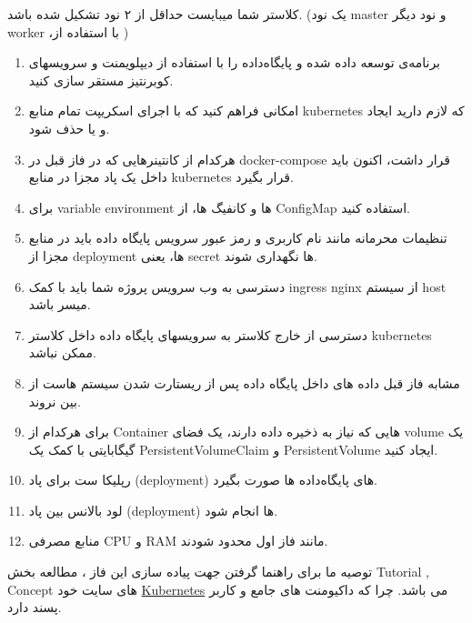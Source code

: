 {کلاستر شما میبایست حداقل از ۲ نود تشکیل شده باشد. (یک نود master و نود دیگر worker ،با استفاده از )
\begin{enumerate}
\item برنامه‌ی توسعه داده شده و پایگاه‌داده را با استفاده از دیپلویمنت و سرویسهای کوبرنتیز مستقر سازی کنید.

\item امکانی فراهم کنید که با اجرای اسکریپت تمام منابع kubernetes که لازم دارید ایجاد و یا حذف شود.

\item هرکدام از کانتینرهایی که در فاز قبل در docker-compose قرار داشت، اکنون باید داخل یک پاد مجزا در منابع kubernetes قرار بگیرد.

\item برای variable environment ها و کانفیگ ها، از ConfigMap استفاده کنید.

\item تنظیمات محرمانه مانند نام کاربری و رمز عبور سرویس پایگاه داده باید در منابع مجزا از deployment ها، یعنی secret ها نگهداری شوند.

\item دسترسی به وب سرویس پروژه شما باید با کمک ingress nginx از سیستم host میسر باشد.

\item دسترسی از خارج کلاستر به سرویسهای پایگاه داده داخل کلاستر kubernetes ممکن نباشد.

\item مشابه فاز قبل داده های داخل پایگاه داده پس از ریستارت شدن سیستم هاست از بین نروند.

\item برای هرکدام از Container هایی که نیاز به ذخیره داده دارند، یک فضای volume یک گیگابایتی با کمک یک PersistentVolumeClaim و PersistentVolume ایجاد کنید.

\item رپلیکا ست برای پاد (deployment) های پایگاه‌داده ها صورت بگیرد.

\item لود بالانس بین پاد (deployment) ها انجام شود.

\item منابع مصرفی CPU و RAM مانند فاز اول محدود شودند.
\end{enumerate}
\hypersetup{
  colorlinks   = true, %
  urlcolor     = green, %
  linkcolor    = green, %
  citecolor   = red %
}
{توصیه ما برای راهنما گرفتن جهت پیاده سازی این فاز ، مطالعه بخش Tutorial , Concept های سایت خود \href{https://kubernetes.io/docs/home/}{Kubernetes} می باشد. چرا که داکیومنت های جامع و کاربر پسند دارد.}\\

}
